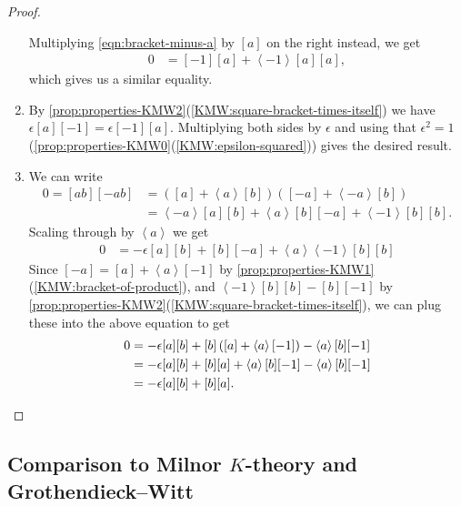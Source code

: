 \documentclass[11pt,openany]{book}
\begin{document}
\begin{proof}
\begin{enumerate}
    Multiplying \autoref{eqn:bracket-minus-a} by $[a]$ on the right instead, we get
    \begin{align*}
        0 &= [-1][a] + \left\langle -1 \right\rangle[a][a],
    \end{align*}
    which gives us a similar equality.
    

    \item By \autoref{prop:properties-KMW2}(\ref{KMW:square-bracket-times-itself}) we have $\epsilon[a][-1] = \epsilon[-1][a]$. Multiplying both sides by $\epsilon$ and using that $\epsilon^2 = 1$ (\autoref{prop:properties-KMW0}(\ref{KMW:epsilon-squared})) gives the desired result. 
    
    \item We can write
    \begin{align*}
        0 = [ab][-ab] &= \left( [a] + \left\langle a \right\rangle[b] \right) \left( [-a] + \left\langle -a \right\rangle[b] \right) \\
        &= \left\langle -a \right\rangle[a][b] + \left\langle a \right\rangle[b][-a] + \left\langle -1 \right\rangle[b][b].
    \end{align*}
    Scaling through by $\left\langle a \right\rangle$ we get
    \begin{align*}
        0 &= -\epsilon[a][b] + [b][-a] + \left\langle a \right\rangle\left\langle -1 \right\rangle[b][b]
    \end{align*}
    Since $[-a] =[a] + \left\langle a \right\rangle[-1]$ by \autoref{prop:properties-KMW1}(\ref{KMW:bracket-of-product}), and $\left\langle -1 \right\rangle[b][b]-[b][-1]$ by \autoref{prop:properties-KMW2}(\ref{KMW:square-bracket-times-itself}), we can plug these into the above equation to get
    \begin{align*}
        0 &= -\epsilon[a][b] + [b] \left( [a] + \left\langle a \right\rangle[-1] \right) - \left\langle a \right\rangle[b][-1] \\
        &= -\epsilon[a][b] + [b][a] + \left\langle a \right\rangle[b][-1] - \left\langle a \right\rangle[b][-1] \\
        &= -\epsilon[a][b] + [b][a].\hfill\qedhere
    \end{align*} 
\end{enumerate}
\end{proof}




\subsection{Comparison to Milnor $K$-theory and Grothendieck--Witt}
\end{document}
